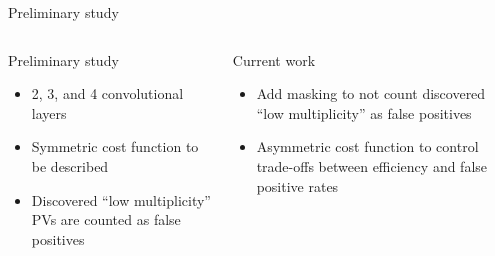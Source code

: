 \begin{frame}{Preliminary study}
\begin{columns}[c]
    \begin{block}{Preliminary study}
      \begin{itemize}
          \item 2, 3, and 4 convolutional layers
          \item Symmetric cost function to be described
          \item Discovered ``low multiplicity'' PVs are counted as false positives
      \end{itemize}
    \end{block}
    \begin{block}{Current work}
      \begin{itemize}
          \item Add masking to not count discovered ``low multiplicity'' as false positives
          \item Asymmetric cost function to control trade-offs between efficiency  and false positive rates
      \end{itemize}
    \end{block}
  \end{columns}
\end{frame}

